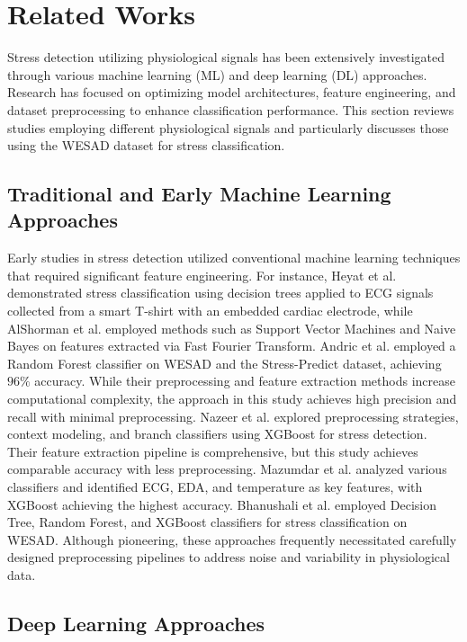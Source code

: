 \section{Related Works}
Stress detection utilizing physiological signals has been extensively investigated through various machine learning (ML) and deep learning (DL) approaches. Research has focused on optimizing model architectures, feature engineering, and dataset preprocessing to enhance classification performance. This section reviews studies employing different physiological signals and particularly discusses those using the WESAD dataset for stress classification.

\subsection{Traditional and Early Machine Learning Approaches}
Early studies in stress detection utilized conventional machine learning techniques that required significant feature engineering. For instance, Heyat et al. \cite{bios12060427} demonstrated stress classification using decision trees applied to ECG signals collected from a smart T-shirt with an embedded cardiac electrode, while AlShorman et al. \cite{alshorman2022frontal} employed methods such as Support Vector Machines and Naive Bayes on features extracted via Fast Fourier Transform. Andric et al. \cite{andric2024anticipating} employed a Random Forest classifier on WESAD and the Stress-Predict dataset, achieving $96\%$ accuracy. While their preprocessing and feature extraction methods increase computational complexity, the approach in this study achieves high precision and recall with minimal preprocessing. Nazeer et al. \cite{nazeer2024improved} explored preprocessing strategies, context modeling, and branch classifiers using XGBoost for stress detection. Their feature extraction pipeline is comprehensive, but this study achieves comparable accuracy with less preprocessing. Mazumdar et al. \cite{mazumdarml} analyzed various classifiers and identified ECG, EDA, and temperature as key features, with XGBoost achieving the highest accuracy. Bhanushali et al. \cite{9184466} employed Decision Tree, Random Forest, and XGBoost classifiers for stress classification on WESAD. Although pioneering, these approaches frequently necessitated carefully designed preprocessing pipelines to address noise and variability in physiological data. 

\subsection{Deep Learning Approaches}

